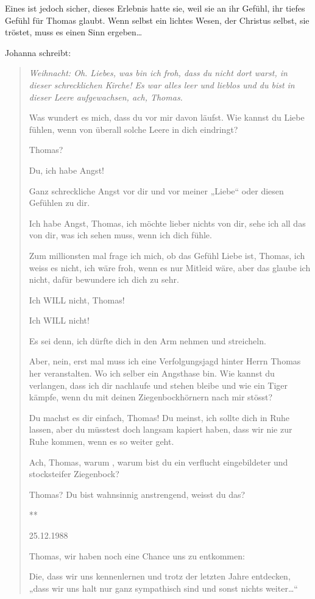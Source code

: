 \documentclass[10pt,a5paper]{book}
\newcommand{\sterne}{\par{\centering ***\par}}
\newenvironment{tg}{\begin{quote}\em}{\end{quote}}
\begin{document}
Eines ist jedoch sicher, dieses Erlebnis hatte sie, weil sie an ihr Gefühl, ihr tiefes Gefühl für Thomas  glaubt. Wenn selbst ein lichtes Wesen, der Christus selbst, sie tröstet, muss es einen Sinn ergeben\dots 

Johanna schreibt:

\begin{tg} 
Weihnacht:
Oh. Liebes, was bin ich froh, dass du nicht dort warst, in dieser schrecklichen Kirche! Es war alles leer und lieblos und du bist in dieser Leere aufgewachsen, ach, Thomas.

Was wundert es mich, dass du vor mir davon läufst. Wie kannst du Liebe fühlen, wenn von überall solche Leere in dich eindringt?

Thomas?

Du, ich habe Angst!

Ganz schreckliche Angst vor dir und vor meiner „Liebe“ oder diesen Gefühlen zu dir.

Ich habe Angst, Thomas, ich möchte lieber nichts von dir, sehe ich all das von dir, was ich sehen muss, wenn ich dich fühle.

Zum millionsten mal frage ich mich, ob das Gefühl Liebe ist, Thomas, ich weiss es nicht, ich wäre froh, wenn es nur Mitleid wäre, aber das glaube ich nicht, dafür bewundere ich dich zu sehr.

Ich WILL nicht, Thomas!

Ich WILL nicht!

Es sei denn, ich dürfte dich in den Arm nehmen und streicheln.

Aber, nein, erst mal muss ich eine Verfolgungsjagd hinter Herrn Thomas her veranstalten. Wo ich selber ein Angsthase bin. Wie kannst du verlangen, dass ich dir nachlaufe und stehen bleibe und wie ein Tiger kämpfe, wenn du mit deinen Ziegenbockhörnern nach mir stösst?

Du machst es dir einfach, Thomas! Du meinst, ich sollte dich in Ruhe lassen, aber du müsstest doch langsam kapiert haben, dass wir nie zur Ruhe kommen, wenn es so weiter geht.

Ach, Thomas, warum , warum bist du ein verflucht eingebildeter und stocksteifer Ziegenbock?

Thomas? Du bist wahnsinnig anstrengend, weisst du das?


\sterne


25.12.1988

Thomas, wir haben noch eine Chance uns zu entkommen:

Die, dass wir uns kennenlernen und trotz der letzten Jahre entdecken, „dass wir uns halt nur ganz sympathisch sind und sonst nichts weiter\dots “


\end{tg}
\end{document}
